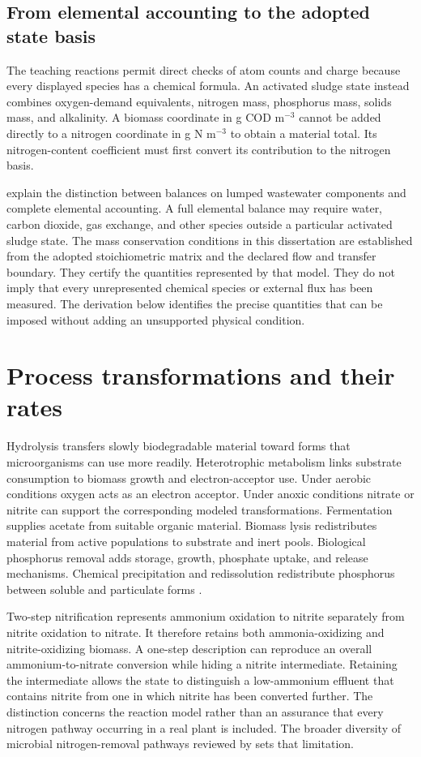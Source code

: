\subsection{From elemental accounting to the adopted state basis}

The teaching reactions permit direct checks of atom counts and charge because every displayed species has a chemical formula. An activated sludge state instead combines oxygen-demand equivalents, nitrogen mass, phosphorus mass, solids mass, and alkalinity. A biomass coordinate in g COD m$^{-3}$ cannot be added directly to a nitrogen coordinate in g N m$^{-3}$ to obtain a material total. Its nitrogen-content coefficient must first convert its contribution to the nitrogen basis.

\citet{TakacsVanrolleghem2006} explain the distinction between balances on lumped wastewater components and complete elemental accounting. A full elemental balance may require water, carbon dioxide, gas exchange, and other species outside a particular activated sludge state. The mass conservation conditions in this dissertation are established from the adopted stoichiometric matrix and the declared flow and transfer boundary. They certify the quantities represented by that model. They do not imply that every unrepresented chemical species or external flux has been measured. The derivation below identifies the precise quantities that can be imposed without adding an unsupported physical condition.

\section{Process transformations and their rates}

Hydrolysis transfers slowly biodegradable material toward forms that microorganisms can use more readily. Heterotrophic metabolism links substrate consumption to biomass growth and electron-acceptor use. Under aerobic conditions oxygen acts as an electron acceptor. Under anoxic conditions nitrate or nitrite can support the corresponding modeled transformations. Fermentation supplies acetate from suitable organic material. Biomass lysis redistributes material from active populations to substrate and inert pools. Biological phosphorus removal adds storage, growth, phosphate uptake, and release mechanisms. Chemical precipitation and redissolution redistribute phosphorus between soluble and particulate forms \citep{Henze2006,Guerrero2011}.

Two-step nitrification represents ammonium oxidation to nitrite separately from nitrite oxidation to nitrate. It therefore retains both ammonia-oxidizing and nitrite-oxidizing biomass. A one-step description can reproduce an overall ammonium-to-nitrate conversion while hiding a nitrite intermediate. Retaining the intermediate allows the state to distinguish a low-ammonium effluent that contains nitrite from one in which nitrite has been converted further. The distinction concerns the reaction model rather than an assurance that every nitrogen pathway occurring in a real plant is included. The broader diversity of microbial nitrogen-removal pathways reviewed by \citet{Duan2022} sets that limitation.

